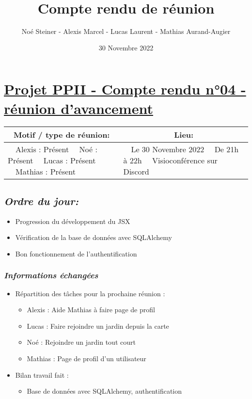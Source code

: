 \documentclass[french,a4paper]{article}
\author{Noé Steiner - Alexis Marcel - Lucas Laurent - Mathias Aurand-Augier}
\date{30 Novembre 2022}
\newcommand{\tabitem}{\textbullet~~}\title{Compte rendu de réunion}
\begin{document}
\maketitle

\section*{\underline{Projet PPII - Compte rendu n°04 - réunion d'avancement}}

\begin{table}[!htb]
  \centering
  \begin{tabular}{| p{7cm} | p{7cm} |}
    \hline
    \multicolumn{1}{|c|}{ Motif / type de réunion:} & \multicolumn{1}{c|}{Lieu:} \\
    \hline
    \tabitem Alexis : Présent\newline
    \tabitem Noé : Présent\newline
    \tabitem Lucas : Présent\newline
    \tabitem Mathias : Présent                      &
    \tabitem Le 30 Novembre 2022\newline
    \tabitem De 21h à 22h\newline
    \tabitem Visioconférence sur Discord                                         \\
    \hline
  \end{tabular}
\end{table}

\subsection*{\textit{Ordre du jour:}}

\begin{itemize}
  \item Progression du développement du JSX
  \item Vérification de la base de données avec SQLAlchemy
  \item Bon fonctionnement de l’authentification
\end{itemize}

\subsubsection*{\textit{Informations échangées}}
\begin{itemize}
  \item Répartition des tâches pour la prochaine réunion :
    \begin{itemize}
      \item Alexis : Aide Mathias à faire page de profil
      \item Lucas : Faire rejoindre un jardin depuis la carte
      \item Noé : Rejoindre un jardin tout court
      \item Mathias : Page de profil d'un utilisateur
    \end{itemize}
  \item Bilan travail fait : 
    \begin{itemize}
      \item Base de données avec SQLAlchemy, authentification
    \end{itemize}
\end{itemize}
\end{document}

